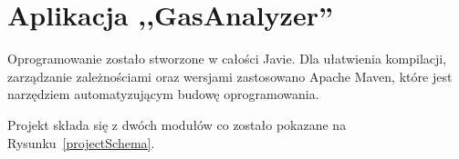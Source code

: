 \section{Aplikacja ,,GasAnalyzer''}
Oprogramowanie zostało stworzone w całości Javie. Dla ułatwienia kompilacji, zarządzanie zależnościami oraz wersjami zastosowano Apache Maven, które jest narzędziem automatyzującym budowę oprogramowania.

Projekt składa się z dwóch modułów co zostało pokazane na Rysunku~\ref{projectSchema}.
